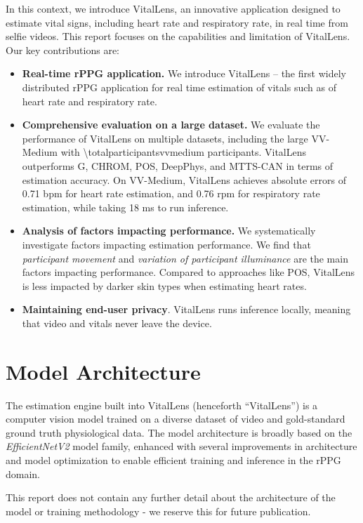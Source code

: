 \documentclass{article}
\begin{document}
In this context, we introduce VitalLens, an innovative application designed to estimate vital signs, including heart rate and respiratory rate, in real time from selfie videos.
This report focuses on the capabilities and limitation of VitalLens.
Our key contributions are:

\begin{itemize}
	\item \textbf{Real-time rPPG application.} We introduce VitalLens -- the first widely distributed rPPG application for real time estimation of vitals such as of heart rate and respiratory rate. 
	\item \textbf{Comprehensive evaluation on a large dataset.} We evaluate the performance of VitalLens on multiple datasets, including the large VV-Medium \cite{toye2023vital} with \num{\totalparticipantsvvmedium} participants. VitalLens outperforms G, CHROM, POS, DeepPhys, and MTTS-CAN in terms of estimation accuracy. On VV-Medium, VitalLens achieves absolute errors of 0.71 bpm for heart rate estimation, and 0.76 rpm for respiratory rate estimation, while taking 18 ms to run inference.
	\item \textbf{Analysis of factors impacting performance.} We systematically investigate factors impacting estimation performance. We find that \textit{participant movement} and \textit{variation of participant illuminance} are the main factors impacting performance. Compared to approaches like POS, VitalLens is less impacted by darker skin types when estimating heart rates. 
	\item \textbf{Maintaining end-user privacy}. VitalLens runs inference locally, meaning that video and vitals never leave the device.
\end{itemize}

\section{Model Architecture}
\label{sec:scope}

The estimation engine built into VitalLens (henceforth ``VitalLens'') is a computer vision model trained on a diverse dataset of video and gold-standard ground truth physiological data.
The model architecture is broadly based on the \textit{EfficientNetV2} \cite{tan2021efficient} model family, enhanced with several improvements in architecture and model optimization to enable efficient training and inference in the rPPG domain.

This report does not contain any further detail about the architecture of the model or training methodology - we reserve this for future publication.
\end{document}
